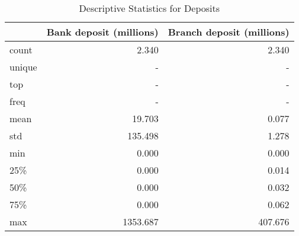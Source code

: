 \begin{table}
\centering
\caption{Descriptive Statistics for Deposits}
\label{tab:des2}
\begin{tabular}{lrr}
\toprule
{} &  Bank deposit (millions) &  Branch deposit (millions) \\
\midrule
count  &                    2.340 &                      2.340 \\
unique &                        - &                          - \\
top    &                        - &                          - \\
freq   &                        - &                          - \\
mean   &                   19.703 &                      0.077 \\
std    &                  135.498 &                      1.278 \\
min    &                    0.000 &                      0.000 \\
25\%    &                    0.000 &                      0.014 \\
50\%    &                    0.000 &                      0.032 \\
75\%    &                    0.000 &                      0.062 \\
max    &                 1353.687 &                    407.676 \\
\bottomrule
\end{tabular}
\end{table}
